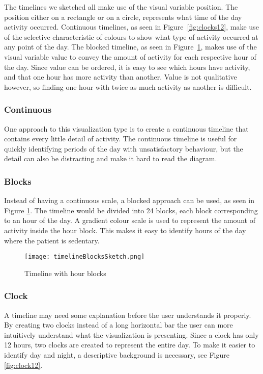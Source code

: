 The timelines we sketched all make use of the visual variable position. The position either on a rectangle or on a circle, represents what time of the day activity occurred. Continuous timelines, as seen in Figure~\ref{fig:clocks12}, make use of the selective characteristic of colours to show what type of activity occurred at any point of the day. The blocked timeline, as seen in Figure~\ref{fig:timelineBlocks}, makes use of the visual variable value to convey the amount of activity for each respective hour of the day. Since value can be ordered, it is easy to see which hours have activity, and that one hour has more activity than another. Value is not qualitative however, so finding one hour with twice as much activity as another is difficult.

\subsubsection{Continuous}
One approach to this visualization type is to create a continuous timeline that contains every little detail of activity. The continuous timeline is useful for quickly identifying periods of the day with unsatisfactory behaviour, but the detail can also be distracting and make it hard to read the diagram.

\subsubsection{Blocks}
Instead of having a continuous scale, a blocked approach can be used, as seen in Figure \ref{fig:timelineBlocks}. The timeline would be divided into 24 blocks, each block corresponding to an hour of the day. A gradient colour scale is used to represent the amount of activity inside the hour block. This makes it easy to identify hours of the day where the patient is sedentary. 

\begin{figure}[h!]
	\centering
		\texttt{[image: timelineBlocksSketch.png]}
		\caption{\footnotesize Timeline with hour blocks}
		\label{fig:timelineBlocks}
\end{figure}

\subsubsection{Clock}
A timeline may need some explanation before the user understands it properly. By creating two clocks instead of a long horizontal bar the user can more intuitively understand what the visualization is presenting. Since a clock has only 12 hours, two clocks are created to represent the entire day. To make it easier to identify day and night, a descriptive background is necessary, see Figure \ref{fig:clock12}.

